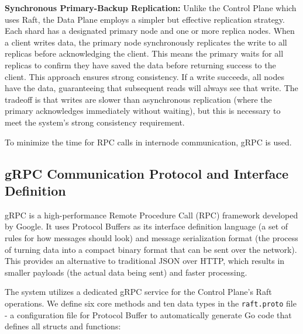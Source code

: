 \documentclass[shortabstract]{iithesis}
\begin{document}
\noindent \textbf{Synchronous Primary-Backup Replication:} Unlike the Control Plane which uses Raft, the Data Plane employs a simpler but effective replication strategy. Each shard has a designated primary node and one or more replica nodes. When a client writes data, the primary node synchronously replicates the write to all replicas before acknowledging the client. This means the primary waits for all replicas to confirm they have saved the data before returning success to the client. This approach ensures strong consistency. If a write succeeds, all nodes have the data, guaranteeing that subsequent reads will always see that write. The tradeoff is that writes are slower than asynchronous replication (where the primary acknowledges immediately without waiting), but this is necessary to meet the system's strong consistency requirement.

To minimize the time for RPC calls in internode communication, gRPC is used.

\subsection{gRPC Communication Protocol and Interface Definition} \label{subsec:grpc_protocol}
gRPC is a high-performance Remote Procedure Call (RPC) framework developed by Google. It uses Protocol Buffers as its interface definition language (a set of rules for how messages should look) and message serialization format (the process of turning data into a compact binary format that can be sent over the network). This provides an alternative to traditional JSON over HTTP, which results in smaller payloads (the actual data being sent) and faster processing.

The system utilizes a dedicated gRPC service for the Control Plane's Raft operations. We define six core methods and ten data types in the \texttt{raft.proto} file - a configuration file for Protocol Buffer to automatically generate Go code that defines all structs and functions:
\end{document}
